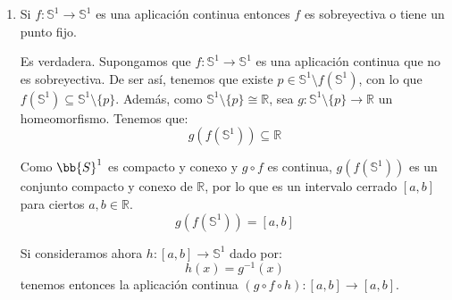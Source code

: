 \documentclass[12pt]{article}
\begin{document}
\begin{ejercicio}
\begin{enumerate}[label=\alph*)]
                Como el número de componentes conexas es un invariante topológico, $A_{i_0}\setminus \{x_0\}$ y $O\setminus \{(0,0)\}$ no pueden ser homeomorfos ($2 \neq 4$), llegando a una contradicción. Por tanto, no existe ninguna aplicación recubridora $p:\mathbb{S}^1\to X$.

            \item Si $f:\mathbb{S}^1\to \mathbb{S}^1$ es una aplicación continua entonces $f$ es sobreyectiva o tiene un punto fijo.

                Es verdadera. Supongamos que $f:\mathbb{S}^1\to \mathbb{S}^1$ es una aplicación continua que no es sobreyectiva. De ser así, tenemos que existe $p\in \mathbb{S}^1\setminus f(\mathbb{S}^1)$, con lo que $f(\mathbb{S}^1)\subseteq \mathbb{S}^1\setminus \{p\}$. Además, como $\mathbb{S}^1\setminus \{p\}\cong \mathbb{R}$, sea $g:\mathbb{S}^1\setminus \{p\}\to \mathbb{R}$ un homeomorfismo. Tenemos que:
                \begin{equation*}
                    g(f(\mathbb{S}^1)) \subseteq \mathbb{R}
                \end{equation*}

                Como $\bb{S}^1$ es compacto y conexo y $g\circ f$ es continua, $g(f(\mathbb{S}^1))$ es un conjunto compacto y conexo de $\mathbb{R}$, por lo que es un intervalo cerrado $[a,b]$ para ciertos $a,b\in \mathbb{R}$.
                \begin{equation*}
                    g(f(\mathbb{S}^1)) = [a,b]
                \end{equation*}
                
                Si consideramos ahora $h:[a,b]\to \mathbb{S}^1$ dado por:
                \begin{equation*}
                    h(x) = g^{-1}(x)
                \end{equation*}
                tenemos entonces la aplicación continua $(g\circ f\circ h):[a,b]\to [a,b]$.
                \begin{figure}[H]
                    \centering
                \end{figure}


\end{enumerate}
\end{ejercicio}
\end{document}
